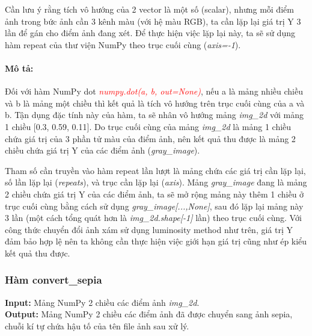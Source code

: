 \documentclass{article}
\begin{document}
Cần lưu ý rằng tích vô hướng của 2 vector là một số (scalar), nhưng mỗi điểm ảnh trong bức ảnh cần 3 kênh màu (với hệ màu RGB), ta cần lặp lại giá trị Y 3 lần để gán cho điểm ảnh đang xét. Để thực hiện việc lặp lại này, ta sẽ sử dụng hàm repeat của thư viện NumPy theo trục cuối cùng (\textit{axis=-1}).

\paragraph{Mô tả:}
Đối với hàm NumPy dot \textcolor{red}{\textit{numpy.dot(a, b, out=None)}}, nếu a là mảng nhiều chiều và b là mảng một chiều thì kết quả là tích vô hướng trên trục cuối cùng của a và b. Tận dụng đặc tính này của hàm, ta sẽ nhân vô hướng mảng \textit{img\_2d} với mảng 1 chiều [0.3, 0.59, 0.11]. Do trục cuối cùng của mảng \textit{img\_2d} là mảng 1 chiều chứa giá trị của 3 phần tử màu của điểm ảnh, nên kết quả thu được là mảng 2 chiều chứa giá trị Y của các điểm ảnh (\textit{gray\_image}). 

Tham số cần truyền vào hàm repeat lần lượt là mảng chứa các giá trị cần lặp lại, số lần lặp lại (\textit{repeats}), và trục cần lặp lại (\textit{axis}). Mảng \textit{gray\_image} đang là mảng 2 chiều chứa giá trị Y của các điểm ảnh, ta sẽ mở rộng mảng này thêm 1 chiều ở trục cuối cùng bằng cách sử dụng \textit{gray\_image[...,None]}, sau đó lặp lại mảng này 3 lần (một cách tổng quát hơn là \textit{img\_2d.shape[-1]} lần) theo trục cuối cùng. Với công thức chuyển đổi ảnh xám sử dụng luminosity method như trên, giá trị Y đảm bảo hợp lệ nên ta không cần thực hiện việc giới hạn giá trị cũng như ép kiểu kết quả thu được.

\subsubsection{Hàm convert\_sepia}
\textbf{Input:} Mảng NumPy 2 chiều các điểm ảnh \textit{img\_2d}. \\
\textbf{Output:} Mảng NumPy 2 chiều các điểm ảnh đã được chuyển sang ảnh sepia, chuỗi kí tự chứa hậu tố của tên file ảnh sau xử lý.
\end{document}
